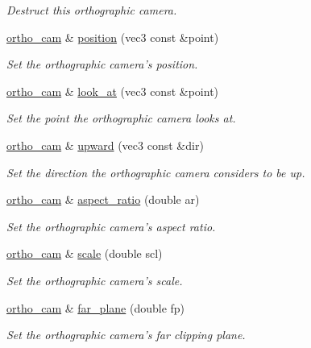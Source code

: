 \begin{DoxyCompactItemize}
\begin{DoxyCompactList}\small\item\em Destruct this orthographic camera. \end{DoxyCompactList}\item 
\hyperlink{classgfx_1_1ortho__cam}{ortho\-\_\-cam} \& \hyperlink{classgfx_1_1ortho__cam_afe5471d3a7e35115185f571d4b238fba}{position} (vec3 const \&point)
\begin{DoxyCompactList}\small\item\em Set the orthographic camera's position. \end{DoxyCompactList}\item 
\hyperlink{classgfx_1_1ortho__cam}{ortho\-\_\-cam} \& \hyperlink{classgfx_1_1ortho__cam_afc22b44b9120637c92c3a358b2a54a1b}{look\-\_\-at} (vec3 const \&point)
\begin{DoxyCompactList}\small\item\em Set the point the orthographic camera looks at. \end{DoxyCompactList}\item 
\hyperlink{classgfx_1_1ortho__cam}{ortho\-\_\-cam} \& \hyperlink{classgfx_1_1ortho__cam_a23d29a456f8127e1e88ca5517f3cd50a}{upward} (vec3 const \&dir)
\begin{DoxyCompactList}\small\item\em Set the direction the orthographic camera considers to be up. \end{DoxyCompactList}\item 
\hyperlink{classgfx_1_1ortho__cam}{ortho\-\_\-cam} \& \hyperlink{classgfx_1_1ortho__cam_a08d859c4ab06a0bcb0ffcd0221b321bb}{aspect\-\_\-ratio} (double ar)
\begin{DoxyCompactList}\small\item\em Set the orthographic camera's aspect ratio. \end{DoxyCompactList}\item 
\hyperlink{classgfx_1_1ortho__cam}{ortho\-\_\-cam} \& \hyperlink{classgfx_1_1ortho__cam_ac7760e5bad7dd1eaf2440bdc1c451c6f}{scale} (double scl)
\begin{DoxyCompactList}\small\item\em Set the orthographic camera's scale. \end{DoxyCompactList}\item 
\hyperlink{classgfx_1_1ortho__cam}{ortho\-\_\-cam} \& \hyperlink{classgfx_1_1ortho__cam_af8236f4efd294a6d4c559e2efb51c37c}{far\-\_\-plane} (double fp)
\begin{DoxyCompactList}\small\item\em Set the orthographic camera's far clipping plane. \end{DoxyCompactList}\end{DoxyCompactItemize}

